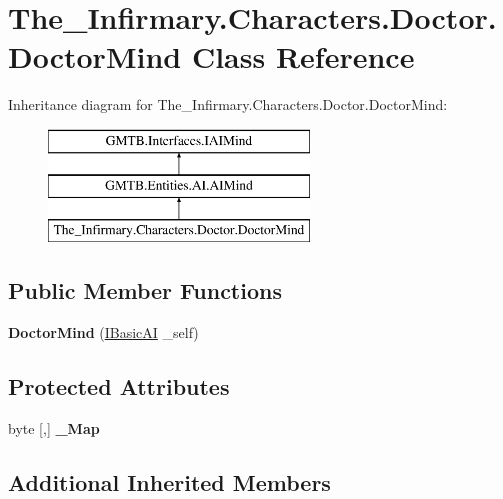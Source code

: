 \hypertarget{class_the___infirmary_1_1_characters_1_1_doctor_1_1_doctor_mind}{}\section{The\+\_\+\+Infirmary.\+Characters.\+Doctor.\+Doctor\+Mind Class Reference}
\label{class_the___infirmary_1_1_characters_1_1_doctor_1_1_doctor_mind}
Inheritance diagram for The\+\_\+\+Infirmary.\+Characters.\+Doctor.\+Doctor\+Mind\+:\begin{figure}[H]
\begin{center}
\leavevmode
\includegraphics[height=3.000000cm]{class_the___infirmary_1_1_characters_1_1_doctor_1_1_doctor_mind}
\end{center}
\end{figure}
\subsection*{Public Member Functions}
\begin{DoxyCompactItemize}
\item 
\mbox{\label{class_the___infirmary_1_1_characters_1_1_doctor_1_1_doctor_mind_ab42b6d8e5ec09016e04a68136aa4893d}} 
{\bfseries Doctor\+Mind} (\mbox{\hyperlink{interface_g_m_t_b_1_1_interfaces_1_1_i_basic_a_i}{I\+Basic\+AI}} \+\_\+self)
\end{DoxyCompactItemize}
\subsection*{Protected Attributes}
\begin{DoxyCompactItemize}
\item 
byte \mbox{[},\mbox{]} {\bfseries \+\_\+\+Map}
\end{DoxyCompactItemize}
\subsection*{Additional Inherited Members}


